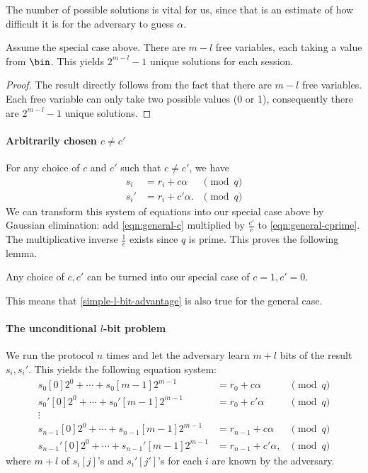 The number of possible solutions is vital for us, since that is an estimate of 
how difficult it is for the adversary to guess \(\alpha\).

\begin{lemma}\label{simple-l-bit-advantage}
  Assume the special case above.
  There are \(m-l\) free variables, each taking a value from \(\bin\).
  This yields \(2^{m-l}-1\) unique solutions for each session.
\end{lemma}
\begin{proof}
  The result directly follows from the fact that there are \(m-l\) free 
  variables.
  Each free variable can only take two possible values (0 or 1), consequently 
  there are \(2^{m-l}-1\) unique solutions.
\end{proof}

\paragraph*{Arbitrarily chosen \(c\neq c'\)}

For any choice of \(c\) and \(c'\) such that \(c\neq c'\), we have
\begin{align}
  \label{eqn:general-c}
  s_i &= r_i + c\alpha &\pmod q\\
  \label{eqn:general-cprime}
  s_i' &= r_i + c'\alpha. &\pmod q
\end{align}
We can transform this system of equations into our special case above by 
Gaussian elimination: add \cref{eqn:general-c} multiplied by \(\frac{c'}{c}\) 
to \cref{eqn:general-cprime}.
The multiplicative inverse \(\frac{1}{c}\) exists since \(q\) is prime.
This proves the following lemma.

\begin{lemma}
  Any choice of \(c, c'\) can be turned into our special case of \(c = 1, c' = 
  0\).
\end{lemma}

This means that \cref{simple-l-bit-advantage} is also true for the general case.

\paragraph*{The unconditional \(l\)-bit problem}

We run the protocol \(n\) times and let the adversary learn \(m+l\) bits of the 
result~\(s_i, s_i'\).
This yields the following equation system:
\begin{align*}
  s_0[0]2^0 + \dotsb + s_0[m-1]2^{m-1} &= r_0 + c\alpha &\pmod q\\
  s_0'[0]2^0 + \dotsb + s_0'[m-1]2^{m-1} &= r_0 + c'\alpha &\pmod q\\
  \vdots \\
  s_{n-1}[0]2^0 + \dotsb + s_{n-1}[m-1]2^{m-1} &= r_{n-1} + c\alpha &\pmod q\\
  s_{n-1}'[0]2^0 + \dotsb + s_{n-1}'[m-1]2^{m-1} &= r_{n-1} + c'\alpha, &\pmod 
  q
\end{align*}
where \(m+l\) of \(s_i[j]\)'s and \(s_i'[j']\)'s for each \(i\) are known by 
the adversary.

